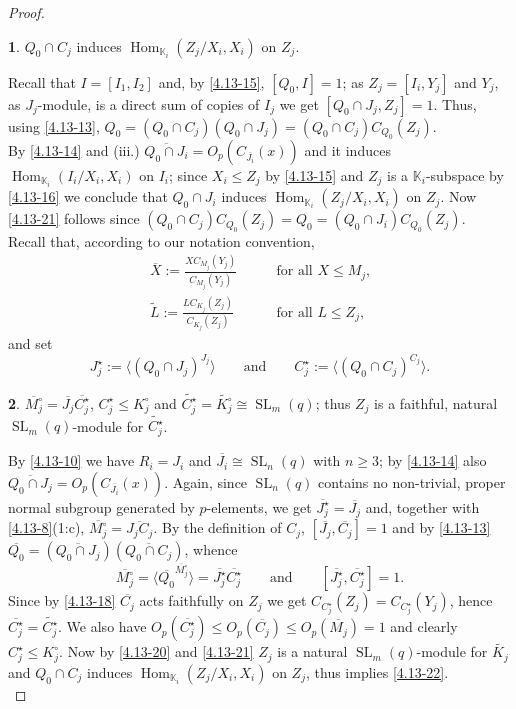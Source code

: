 \documentclass{amsart}
\numberwithin{equation}{section}
\theoremstyle{definition}
\theoremstyle{subresult}
\newtheorem{subresult}{}[equation]
\theoremstyle{caseresult}
\newcommand{\bK}{\mathbb{K}}
\newcommand{\Hom}{\operatorname{Hom}}
\newcommand{\SL}{\operatorname{SL}}
\newcommand{\ov}{\overline}
\newcommand{\<}{\langle}
\renewcommand{\>}{\rangle}
\begin{document}
\begin{proof}
	\begin{subresult}\label{4.13-21}
		$Q_0 \cap C_j$ induces $\Hom_{\bK_i}(Z_j/X_i, X_i)$ on $Z_j$.
	\end{subresult}
	Recall that $I=[I_1,I_2]$ and, by \eqref{4.13-15}, $[Q_0,I]=1$; as $Z_j=[I_i,Y_j]$ and $Y_j$, as $J_j$-module,  is a direct sum of copies of $I_j$ we get $[Q_0 \cap J_j, Z_j] =1$. Thus, using \eqref{4.13-13}, $Q_0=(Q_0\cap C_j)(Q_0 \cap J_j) = (Q_0 \cap C_j)C_{Q_0}(Z_j)$.\\
	By \eqref{4.13-14} and (iii.) $\ov{Q_0 \cap J_i} = O_p(C_{\ov{J_i}}(x))$ and it induces $\Hom_{\bK_i}(I_i/X_i,X_i)$ on $I_i$; since $X_i \le Z_j$ by \eqref{4.13-15} and $Z_j$ is a $\bK_i$-subspace by \eqref{4.13-16} we conclude that $Q_0 \cap J_i$ induces $\Hom_{\bK_i}(Z_j/X_i,X_i)$ on $Z_j$. Now \eqref{4.13-21} follows since $(Q_0 \cap C_j)C_{Q_0}(Z_j) = Q_0 =(Q_0 \cap J_i)C_{Q_0}(Z_j)$.\\
	
	Recall that, according to our notation convention,
	\begin{align*}
		\ov{X} := \frac{X C_{M_j}(Y_j)}{C_{M_j}(Y_j)} \qquad & \text{for all $X \le M_j$,} \\
		\widetilde{L} := \frac{L C_{K_j}(Z_j)}{C_{K_j}(Z_j)} \qquad  & \text{for all $L \le Z_j$,}
	\end{align*}
	and set
	\[
	J_j^\star := \< (Q_0 \cap J_j)^{J_j} \> \qquad \text{and} \qquad C_j^\star := \< (Q_0 \cap C_j)^{C_j} \>. 
	\]
	
	\begin{subresult}\label{4.13-22}
		$\ov{M_j^\circ} = \ov{J_j}\ov{C_j^\star}$, $C_j^\star \le K_j^\circ$ and $\widetilde{C_j^\star} = \widetilde{K_j^\circ} \cong \SL_m(q)$; thus $Z_j$ is a faithful, natural $\SL_m(q)$-module for $\widetilde{C_j^\star}$.
	\end{subresult}
	By \eqref{4.13-10} we have $R_i = J_i$ and $\ov{J_i} \cong \SL_n(q)$ with $n \ge 3$; by \eqref{4.13-14} also $\ov{Q_0 \cap J_j} = O_p(C_{\ov{J_i}}(x))$. Again, since $\SL_n(q)$ contains no non-trivial, proper normal subgroup generated by $p$-elements, we get $\ov{J_j^\star}=\ov{J_j}$ and, together with \eqref{4.13-8}(1:c), $\ov{M_j^\circ} = \ov{J_jC_j}$. By the definition of $C_j$, $[\ov{J_j}, \ov{C_j}]=1$ and by \eqref{4.13-13} $\ov{Q_0} = (\ov{Q_0 \cap J_j})(\ov{Q_0 \cap C_j})$, whence
	\begin{equation*}
		\label{eq-4.13-20}
		\tag{$\dagger$}
		\ov{M_j^\circ} = \< \ov{Q_0}^{\ov{M_j^\circ}} \> = \ov{J_j^\star}\ov{C_j^\star} \qquad \text{and} 	\qquad [\ov{J_j^\star}, \ov{C_j^\star}] = 1.
	\end{equation*}
	Since by \eqref{4.13-18} $\ov{C_j}$ acts faithfully on $Z_j$ we get $C_{C_j^\star}(Z_j) = C_{C_j^\star}(Y_j)$, hence $\ov{C_j^\star} = \widetilde{C_j^\star}$. We also have $O_p(\ov{C_j^\star}) \le O_p(\ov{C_j}) \le O_p(\ov{M_j}) =1$ and clearly $C_j^\star \le K_j^\circ$. Now by \eqref{4.13-20} and \eqref{4.13-21} $Z_j$ is a natural $\SL_m(q)$-module for $\widetilde{K_j}$ and $Q_0 \cap C_j$ induces $\Hom_{\bK_i}(Z_j/X_i,X_i)$ on $Z_j$, thus \cite[Lemma 7.2]{MS:2008} implies \eqref{4.13-22}.\\
	

\end{proof}
\end{document}

